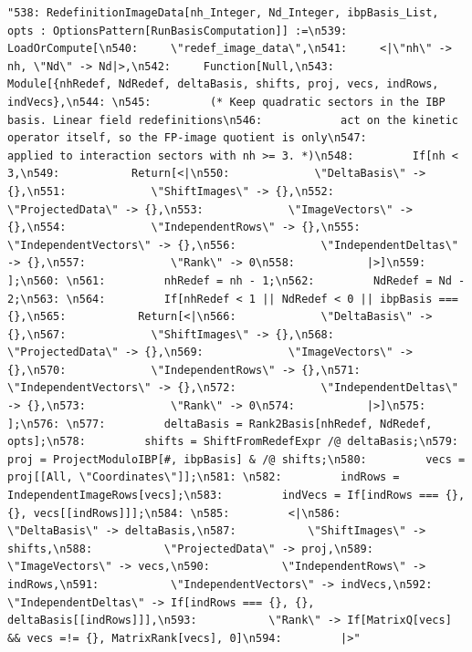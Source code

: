 \documentclass[11pt]{article}
\begin{document}
\begin{verbatim}
"538: RedefinitionImageData[nh_Integer, Nd_Integer, ibpBasis_List, opts : OptionsPattern[RunBasisComputation]] :=\n539:   LoadOrCompute[\n540:     \"redef_image_data\",\n541:     <|\"nh\" -> nh, \"Nd\" -> Nd|>,\n542:     Function[Null,\n543:       Module[{nhRedef, NdRedef, deltaBasis, shifts, proj, vecs, indRows, indVecs},\n544: \n545:         (* Keep quadratic sectors in the IBP basis. Linear field redefinitions\n546:            act on the kinetic operator itself, so the FP-image quotient is only\n547:            applied to interaction sectors with nh >= 3. *)\n548:         If[nh < 3,\n549:           Return[<|\n550:             \"DeltaBasis\" -> {},\n551:             \"ShiftImages\" -> {},\n552:             \"ProjectedData\" -> {},\n553:             \"ImageVectors\" -> {},\n554:             \"IndependentRows\" -> {},\n555:             \"IndependentVectors\" -> {},\n556:             \"IndependentDeltas\" -> {},\n557:             \"Rank\" -> 0\n558:           |>]\n559:         ];\n560: \n561:         nhRedef = nh - 1;\n562:         NdRedef = Nd - 2;\n563: \n564:         If[nhRedef < 1 || NdRedef < 0 || ibpBasis === {},\n565:           Return[<|\n566:             \"DeltaBasis\" -> {},\n567:             \"ShiftImages\" -> {},\n568:             \"ProjectedData\" -> {},\n569:             \"ImageVectors\" -> {},\n570:             \"IndependentRows\" -> {},\n571:             \"IndependentVectors\" -> {},\n572:             \"IndependentDeltas\" -> {},\n573:             \"Rank\" -> 0\n574:           |>]\n575:         ];\n576: \n577:         deltaBasis = Rank2Basis[nhRedef, NdRedef, opts];\n578:         shifts = ShiftFromRedefExpr /@ deltaBasis;\n579:         proj = ProjectModuloIBP[#, ibpBasis] & /@ shifts;\n580:         vecs = proj[[All, \"Coordinates\"]];\n581: \n582:         indRows = IndependentImageRows[vecs];\n583:         indVecs = If[indRows === {}, {}, vecs[[indRows]]];\n584: \n585:         <|\n586:           \"DeltaBasis\" -> deltaBasis,\n587:           \"ShiftImages\" -> shifts,\n588:           \"ProjectedData\" -> proj,\n589:           \"ImageVectors\" -> vecs,\n590:           \"IndependentRows\" -> indRows,\n591:           \"IndependentVectors\" -> indVecs,\n592:           \"IndependentDeltas\" -> If[indRows === {}, {}, deltaBasis[[indRows]]],\n593:           \"Rank\" -> If[MatrixQ[vecs] && vecs =!= {}, MatrixRank[vecs], 0]\n594:         |>"
\end{verbatim}
\end{document}

